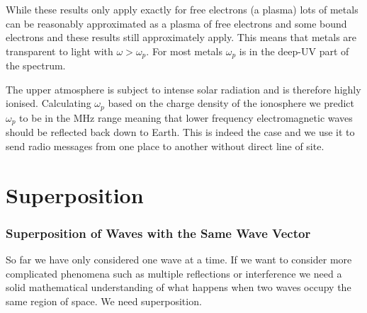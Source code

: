     While these results only apply exactly for free electrons (a plasma) lots of metals can be reasonably approximated as a plasma of free electrons and some bound electrons and these results still approximately apply.
    This means that metals are transparent to light with \(\omega > \omega_p\).
    For most metals \(\omega_p\) is in the deep-UV part of the spectrum.
    
    The upper atmosphere is subject to intense solar radiation and is therefore highly ionised.
    Calculating \(\omega_p\) based on the charge density of the ionosphere we predict \(\omega_p\) to be in the \si{\mega\hertz} range meaning that lower frequency electromagnetic waves should be reflected back down to Earth.
    This is indeed the case and we use it to send radio messages from one place to another without direct line of site.
    
    \part{Superposition}
    \section{Superposition of Waves with the Same Wave Vector}
    So far we have only considered one wave at a time.
    If we want to consider more complicated phenomena such as multiple reflections or interference we need a solid mathematical understanding of what happens when two waves occupy the same region of space.
    We need superposition.
    
